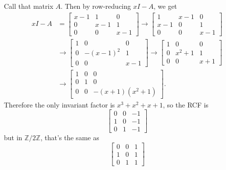 \documentclass[12pt]{article}
\begin{document}
\section{}
\noindent{}\bigskip\par
Call that matrix $A$. Then by row-reducing $xI-A$, we get
\begin{align*}
    xI-A & = \begin{bmatrix}
        x-1 & 1 & 0 \\
        0 & x-1 & 1 \\
        0 & 0 & x-1
    \end{bmatrix} \rightarrow \begin{bmatrix}
        1 & x-1 & 0 \\
        x-1 & 0 & 1 \\
        0 & 0 & x-1
    \end{bmatrix} \\
         & \rightarrow \begin{bmatrix}
             1 & 0 & 0 \\
             0 & -(x-1)^2 & 1 \\
             0 & 0 & x-1
         \end{bmatrix} \rightarrow \begin{bmatrix}
             1 & 0 & 0 \\
             0 & x^2 + 1 & 1 \\
             0 & 0 & x+1
         \end{bmatrix} \\
         & \rightarrow \begin{bmatrix}
             1 & 0 & 0 \\
             0 & 1 & 0 \\
             0 & 0 & -(x+1)(x^2+1)
         \end{bmatrix}.
\end{align*}
Therefore the only invariant factor is $x^3+x^2+x+1$, so the RCF is
\[ \begin{bmatrix}
    0 & 0 & -1 \\
    1 & 0 & -1 \\
    0 & 1 & -1
\end{bmatrix} \]
but in $\mathbb{Z}/2\mathbb{Z}$, that's the same as
\[ \begin{bmatrix}
    0 & 0 & 1 \\
    1 & 0 & 1 \\
    0 & 1 & 1
\end{bmatrix} \]
\end{document}
